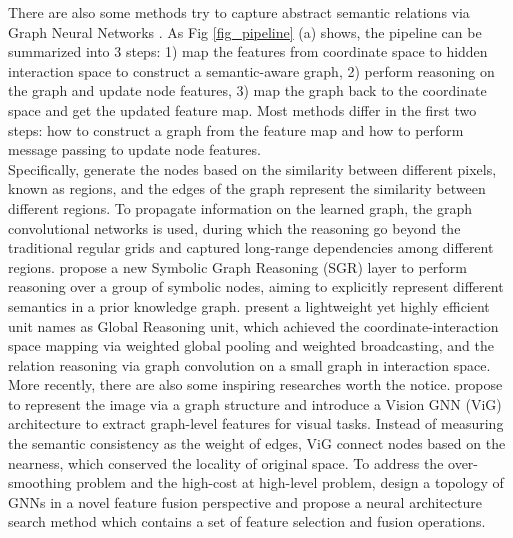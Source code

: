 ﻿\documentclass[journal]{IEEEtran}
\begin{document}
    
    There are also some methods try to capture abstract semantic relations via Graph Neural Networks \cite{li2018beyondgrids}\cite{liang2018symbolicRG}\cite{chen2019glore}. As Fig \ref{fig_pipeline} (a) shows, the pipeline can be summarized into 3 steps: 1) map the features from coordinate space to hidden interaction space to construct a semantic-aware graph, 2) perform reasoning on the graph and update node features, 3) map the graph back to the coordinate space and get the updated feature map. Most methods differ in the first two steps: how to construct a graph from the feature map and how to perform message passing to update node features. \\   
    
    
    Specifically, \cite{li2018beyondgrids} generate the nodes based on the similarity between different pixels, known as regions, and the edges of the graph represent the similarity between different regions. To propagate information on the learned graph, the graph convolutional networks is used\cite{kipf2016GCN}, during which the reasoning go beyond the traditional regular grids and captured long-range dependencies among different regions. \cite{liang2018symbolicRG} propose a new Symbolic Graph Reasoning (SGR) layer to perform reasoning over a group of symbolic nodes, aiming to explicitly represent different semantics in a prior knowledge graph.  \cite{chen2019glore} present a lightweight yet highly efficient unit names as Global Reasoning unit, which achieved the coordinate-interaction space mapping via weighted global pooling and weighted broadcasting, and the relation reasoning via graph convolution on a small graph in interaction space. \\   

    
    More recently, there are also some inspiring researches worth the notice. \cite{han2022VIG} propose to represent the image via a graph structure and introduce a Vision GNN (ViG) architecture to extract graph-level features for visual tasks. Instead of measuring the semantic consistency as the weight of edges, ViG connect nodes based on the nearness, which conserved the locality of original space. To address the over-smoothing problem and the high-cost at high-level problem, \cite{2022TopoGNNFusion} design a topology of GNNs in a novel feature fusion perspective and propose a neural architecture search method which contains a set of feature selection and fusion operations.\\   
\end{document}
